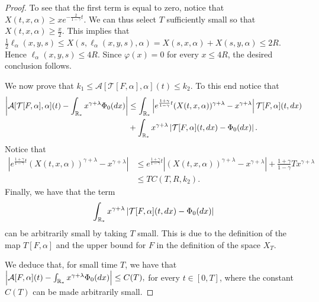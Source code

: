 \documentclass[11pt]{article}
\numberwithin{equation}{section}
\theoremstyle{plain}
\newcommand{\der}{\textup{d}}
\begin{document}
\begin{proof}
 To see that the first term is equal to zero, notice that $X(t, x, \alpha) \geq x e^{- \frac{2}{1-\gamma } t}$. We can thus select $T$ sufficiently small so that $X(t, x, \alpha) \geq \frac{x}{2}$. 
This implies that 
 $ \frac{1}{2} \ell_\alpha(x,y,s) \leq  X(s, \ell_\alpha(x,y,s), \alpha )= X(s, x, \alpha ) + X(s, y, \alpha ) \leq 2 R  $.
 Hence $\ell_\alpha(x,y,s) \leq 4R$. Since $\varphi(x)=0$ for every $x \leq 4 R$, the desired conclusion follows.
 
We now prove that $k_1 \leq \mathcal A[ \mathcal T[F,\alpha] ,\alpha](t) \leq k_2$. To this end notice that 
\begin{align*}
  \left| \mathcal A[\mathcal T[F,\alpha],\alpha](t)  - \int_{\mathbb R_*} x^{\gamma+\lambda} \Phi_0(\der x) \right| 
  & \leq \int_{\mathbb R_*} \left| e^{\frac{1+\gamma}{1-\gamma } t }  (X(t,x,\alpha))^{\gamma+\lambda}-x^{\gamma+\lambda} \right| \mathcal T[F,\alpha](t, \der x) \\
  &+  \int_{\mathbb R_*} x^{\gamma+\lambda} \left| \mathcal T[F,\alpha](t, \der x)  -\Phi_0(\der x) \right| .
\end{align*}
Notice that
\begin{align*}
\left| e^{\frac{1+\gamma}{1-\gamma } t }  (X(t,x,\alpha))^{\gamma+\lambda}-x^{\gamma+\lambda} \right| &\leq  e^{\frac{1+\gamma}{1-\gamma } t } \left| (X(t,x,\alpha))^{\gamma+\lambda}-x^{\gamma+\lambda} \right| + \frac{1+\gamma}{1-\gamma } T x^{\gamma+\lambda}\\
&\leq T C(T, R, k_2) .
\end{align*}
Finally, we have that the term 
\begin{align*}
     \int_{\mathbb R_*} x^{\gamma+\lambda} \left| \mathcal T[F,\alpha](t, \der x)  - \Phi_{0}( \der x)  \right| 
\end{align*}
can be arbitrarily small by taking $T$ small. This is due to the definition of the map $T[F,\alpha]$ and the upper bound for $F $ in the definition of the space $X_{T}$.

We deduce that, for small time $T$, we have that $ \left| \mathcal A[F,\alpha](t) - \int_{\mathbb R_*} x^{\gamma+\lambda} \Phi_0(\der x ) \right| \leq  C(T),$ for every $t \in [0, T] $, where the constant $C(T) $ can be made arbitrarily small. 


\end{proof}
\end{document}
